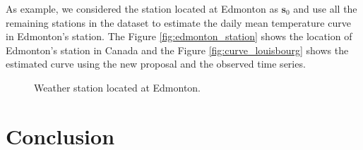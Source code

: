 \documentclass[]{interact}
\theoremstyle{plain}%
\theoremstyle{definition}
\theoremstyle{remark}
\begin{document}
As example, we considered the station located at Edmonton as \(\bm{s}_0\) and use all the remaining stations in the dataset to estimate the daily mean temperature curve in Edmonton's station. The Figure \ref{fig:edmonton_station} shows the location of Edmonton's station in Canada and the Figure \ref{fig:curve_louisbourg} shows the estimated curve using the new proposal and the observed time series.

\begin{figure}[htbp]
  \hfill
    \caption{Weather station located at Edmonton.}
\end{figure}

\hypertarget{sec:conclusion}{%
\section{Conclusion}\label{sec:conclusion}}
\end{document}

